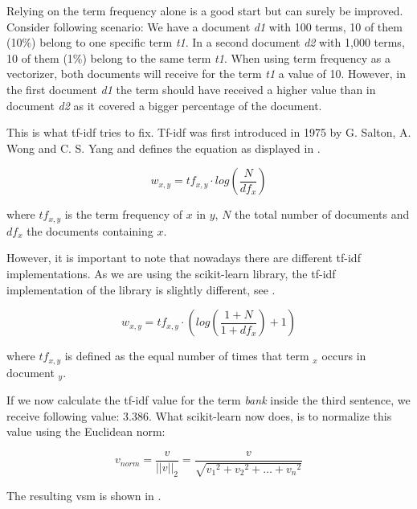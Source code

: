 Relying on the term frequency alone is a good start but can surely be improved.
Consider following scenario:
We have a document \textit{d1} with 100 terms, 10 of them (10\%) belong to one specific term \textit{t1}.
In a second document \textit{d2} with 1,000 terms, 10 of them (1\%) belong to the same term \textit{t1}.
When using term frequency as a vectorizer, both documents will receive for the term \textit{t1} a value of 10.
However, in the first document \textit{d1} the term should have received a higher value
than in document \textit{d2} as it covered a bigger percentage of the document.

This is what tf-idf tries to fix.
Tf-idf was first introduced in 1975 by G. Salton, A. Wong and C. S. Yang\cite{salton1975}
and defines the equation as displayed in .

\begin{equation}
    w_{x,y} = tf_{x,y} \cdot log(\frac{N}{df_x})
    \label{equ:tfidf}
\end{equation}

where $tf_{x,y}$ is the term frequency of $x$ in $y$, $N$ the total number of documents
and $df_x$ the documents containing $x$.

However, it is important to note that nowadays there are different tf-idf implementations.
As we are using the scikit-learn\cite{scikit-learn} library,
the tf-idf implementation\cite{scikit_tfidf} of the library is slightly different,
see .

\begin{equation}
    w_{x,y} = tf_{x,y} \cdot (log(\frac{1+N}{1+df_x}) + 1)
    \label{equ:scikit_tfidf}
\end{equation}

where $tf_{x,y}$ is defined as the equal number of times that term ${_x}$ occurs in document ${_y}$.

If we now calculate the tf-idf value for the term \textit{bank} inside the third sentence,
we receive following value: $3.386$.
What scikit-learn now does, is to normalize this value using the Euclidean norm:

\begin{equation}
    v_{norm} = \frac{v}{||v||_2} = \frac{v}{\sqrt{v_1{^2}+v_2{^2}+\ldots+v_n{^2}}}
    \label{equ:euclidean}
\end{equation}

The resulting \Gls{vsm} is shown in .


